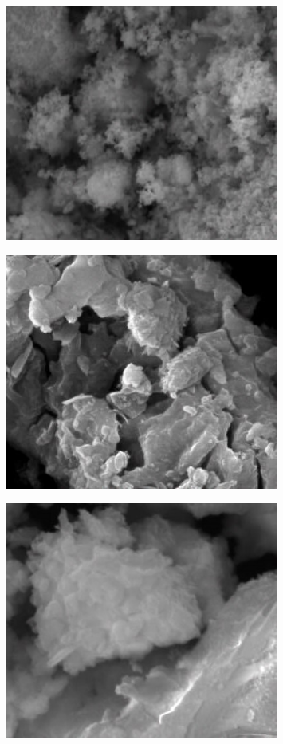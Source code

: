 \begin{figure}[H]
	\centering
	\includegraphics[width=0.8\textwidth]{assets/71}
	\caption*{}
\end{figure}\begin{figure}[H]
	\centering
	\includegraphics[width=0.8\textwidth]{assets/72}
	\caption*{}
\end{figure}\begin{figure}[H]
	\centering
	\includegraphics[width=0.8\textwidth]{assets/73}
	\caption*{}
\end{figure}


